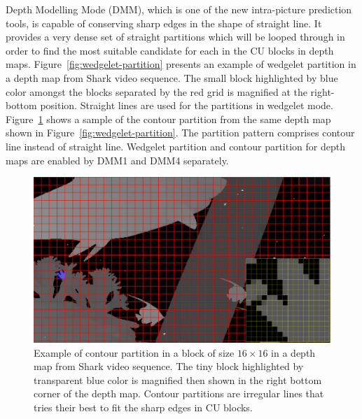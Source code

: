 Depth Modelling Mode (DMM), which is one of the new intra-picture
prediction tools, is capable of conserving sharp edges in the shape
of straight line.
It provides a very dense set of straight partitions
which will be looped through in order to find the most suitable candidate
for each in the CU blocks in depth maps.
Figure~\ref{fig:wedgelet-partition} presents an example of wedgelet
partition in a depth map from Shark video sequence.
The small block highlighted by blue color amongst the blocks
separated by the red grid is magnified at the right-bottom position.
Straight lines are used for the partitions in wedgelet mode.
Figure~\ref{fig:contour-partition} shows a sample of the contour partition
from the same depth map shown in Figure~\ref{fig:wedgelet-partition}.
The partition pattern comprises contour line instead of
straight line.
Wedgelet partition and contour partition for depth maps
are enabled by DMM1 and DMM4 separately.
\begin{figure}
    \centering
    \includegraphics[width=\textwidth,height=\textheight,keepaspectratio]{Figures/contour}
    \caption[Contour partition illustration]
    {Example of contour partition in a block of size \(16\times16\) in a depth map
    from Shark video sequence.
    The tiny block highlighted by transparent blue color
    is magnified then shown in the right bottom corner
    of the depth map.
    Contour partitions are irregular lines
    that tries their best to fit the sharp edges in CU blocks.
    }\label{fig:contour-partition}
\end{figure}


